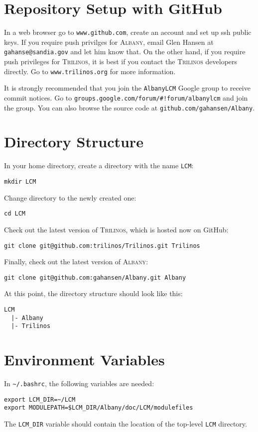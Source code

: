 \documentclass{article}
\newcommand{\trilinos}{\textsc{Trilinos}}
\newcommand{\albany}{\textsc{Albany}}
\begin{document}
\section{Repository Setup with GitHub}

In a web browser go to \verb+www.github.com+, create an account and
set up ssh public keys. If you require push privilges for \albany{},
email Glen Hansen at \verb+gahanse@sandia.gov+ and let him know
that. On the other hand, if you require push privileges for \trilinos{},
it is best if you contact the \trilinos{} developers directly. Go to
\verb+www.trilinos.org+ for more information.

It is strongly recommended that you join the \verb+AlbanyLCM+ Google
group to receive commit notices. Go to
\verb+groups.google.com/forum/#!forum/albanylcm+ and join the
group. You can also browse the source code at
\verb+github.com/gahansen/Albany+.

\section{Directory Structure}
In your home directory, create a directory with the name \verb+LCM+:
\begin{verbatim}
mkdir LCM
\end{verbatim}

Change directory to the newly created one:
\begin{verbatim}
cd LCM
\end{verbatim}

Check out the latest version of \trilinos{}, which is hosted now on
GitHub:
\begin{verbatim}
git clone git@github.com:trilinos/Trilinos.git Trilinos
\end{verbatim}

Finally, check out the latest version of \albany{}:
\begin{verbatim}
git clone git@github.com:gahansen/Albany.git Albany
\end{verbatim}

At this point, the directory structure should look like this:
\begin{verbatim}
LCM
  |- Albany
  |- Trilinos
\end{verbatim}

\section{Environment Variables}
In \verb+~/.bashrc+, the following variables are needed:
\begin{verbatim}
export LCM_DIR=~/LCM
export MODULEPATH=$LCM_DIR/Albany/doc/LCM/modulefiles
\end{verbatim}
The \verb+LCM_DIR+ variable should contain the location of the
top-level \verb+LCM+ directory.
\end{document}
